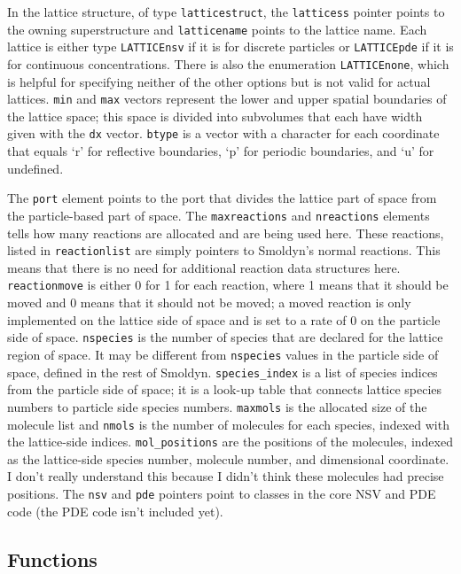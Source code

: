 \documentclass {book}
\begin{document}
In the lattice structure, of type \texttt{latticestruct}, the \texttt{latticess} pointer points to the owning superstructure and \texttt{latticename} points to the lattice name.  Each lattice is either type \texttt{LATTICEnsv} if it is for discrete particles or \texttt{LATTICEpde} if it is for continuous concentrations.  There is also the enumeration \texttt{LATTICEnone}, which is helpful for specifying neither of the other options but is not valid for actual lattices.  \texttt{min} and \texttt{max} vectors represent the lower and upper spatial boundaries of the lattice space; this space is divided into subvolumes that each have width given with the \texttt{dx} vector.  \texttt{btype} is a vector with a character for each coordinate that equals `r' for reflective boundaries, `p' for periodic boundaries, and `u' for undefined.

The \texttt{port} element points to the port that divides the lattice part of space from the particle-based part of space.  The \texttt{maxreactions} and \texttt{nreactions} elements tells how many reactions are allocated and are being used here.  These reactions, listed in \texttt{reactionlist} are simply pointers to Smoldyn's normal reactions.  This means that there is no need for additional reaction data structures here.  \texttt{reactionmove} is either 0 for 1 for each reaction, where 1 means that it should be moved and 0 means that it should not be moved; a moved reaction is only implemented on the lattice side of space and is set to a rate of 0 on the particle side of space.  \texttt{nspecies} is the number of species that are declared for the lattice region of space.  It may be different from \texttt{nspecies} values in the particle side of space, defined in the rest of Smoldyn.  \texttt{species\_index} is a list of species indices from the particle side of space;  it is a look-up table that connects lattice species numbers to particle side species numbers.  \texttt{maxmols} is the allocated size of the molecule list and \texttt{nmols} is the number of molecules for each species, indexed with the lattice-side indices.  \texttt{mol\_positions} are the positions of the molecules, indexed as the lattice-side species number, molecule number, and dimensional coordinate.  I don't really understand this because I didn't think these molecules had precise positions.  The \texttt{nsv} and \texttt{pde} pointers point to classes in the core NSV and PDE code (the PDE code isn't included yet).

\subsection*{Functions}
\end{document}
